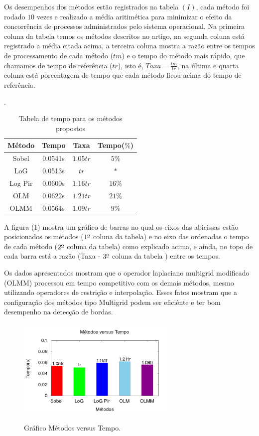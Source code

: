 \documentclass[a4paper]{article} %
\begin{document}
Os desempenhos dos métodos estão registrados na tabela $(I)$, cada método foi rodado $10$ vezes e realizado a média aritimética para minimizar o efeito da concorrência de processos administrados pelo sistema operacional. Na primeira coluna da tabela temos  os métodos descritos no artigo, na segunda coluna está registrado a média citada acima, a terceira coluna mostra a razão entre os tempos de processamento de cada método ($tm$) e o tempo do método mais rápido, que chamamos de tempo de referência ($tr$), isto é, $Taxa=\frac{tm}{tr}$, na última e quarta coluna está porcentagem de tempo que cada método ficou acima do tempo de referência.    
\begin{table}[h]
\centering
\caption{Tabela de tempo para os métodos propostos}.
\begin{tabular}{|c|c|c|c|}
\hline                  
Método & Tempo & Taxa  & Tempo($\%$) \\
\hline                  
Sobel   & 0.0541s  &  $1.05tr$& $5\%$   \\
LoG     & 0.0513s  &  $tr$& $*$   \\
Log Pir & 0.0600s  &  $1.16tr$& $16\%$ \\
OLM     & 0.0622s  &  $1.21tr$& $21\%$ \\
OLMM    & 0.0564s  &  $1.09tr$& $9\%$    \\ 
\hline                  
\end{tabular}
\end{table}

A figura (1) mostra um gráfico de barras no qual os eixos das abicissas estão posicionados os métodos ($1\textsuperscript{\underline{o}}$ coluna da tabela) e no eixo das ordenadas o tempo de cada método ($2\textsuperscript{\underline{o}}$ coluna da tabela) como explicado acima, e ainda, no topo de cada barra está a razão (Taxa - $3\textsuperscript{\underline{o}}$ coluna da tabela ) entre os tempos.

Os dados apresentados mostram que o operador laplaciano multigrid modificado (OLMM) processou em tempo competitivo com os demais métodos, mesmo utilizando operadores de restrição e interpolação. Esses fatos mostram que a configuração dos métodos tipo Multigrid podem ser eficiênte e ter bom desempenho na detecção de bordas. 

\begin{figure}[!htb]
\centering
\includegraphics[width=3.0in]{output.jpg}
\label{output}
\caption{Gráfico Métodos versus Tempo.}
\end{figure}
\end{document}
